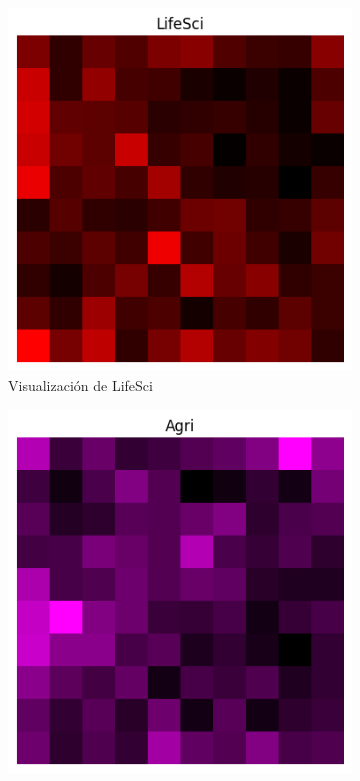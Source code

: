 \documentclass{article}
\theoremstyle{mytheoremstyle}
\theoremstyle{mytheoremstyle}
\theoremstyle{myproblemstyle}
\begin{document}
\begin{itemize}
        \begin{figure}[!ht]
          \centering
          \begin{subfigure}[b]{0.45\textwidth}
            \centering
            \includegraphics[width=\linewidth]{images/LifeSci.png}
            \caption{Visualización de LifeSci}
            \label{fig:LifeSci}
          \end{subfigure}
          \begin{subfigure}[b]{0.45\textwidth}
            \centering
            \includegraphics[width=\linewidth]{images/Agri.png}

\end{subfigure}
\end{figure}
\end{itemize}
\end{document}
